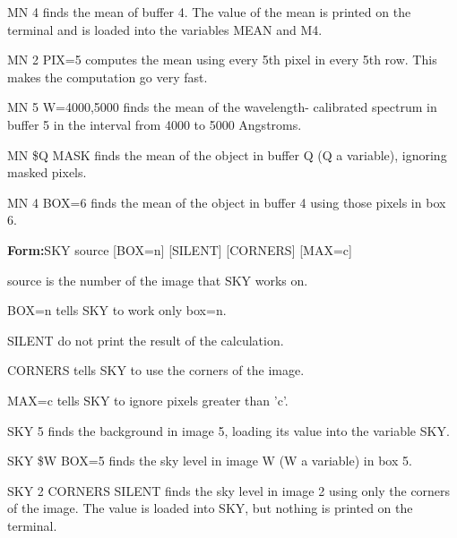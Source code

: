 {\newpage\clearpage
{}%
\begin{example}
  \item[MN 4\hfill]{finds the mean of buffer 4.  The
  value of the mean is printed on the terminal and is loaded into the 
  variables MEAN and M4.}
  \item[MN 2 PIX=5\hfill]{computes the mean using every 5th 
  pixel in every 5th row.  This makes the computation go very fast.}
  \item[MN 5 W=4000,5000\hfill]{finds the mean of the wavelength-
  calibrated spectrum in buffer 5 in the interval from 4000 to 5000 Angstroms.}
  \item[MN \$Q MASK\hfill]{finds the mean of the object in buffer
  Q (Q a variable), ignoring masked pixels.}
  \item[MN 4 BOX=6\hfill]{finds the mean of the object in
  buffer 4 using those pixels in box 6.}
\end{example}%
\lthtmlfigureZ
\lthtmlcheckvsize\clearpage}

{\newpage\clearpage
{}%
\begin{command}
  \item[\textbf{Form:}SKY source {[BOX=n]} {[SILENT]} {[CORNERS]}
       {[MAX=c]}\hfill]{}
  \item[source]{is the number of the image that SKY works on.}
  \item[BOX=n]{tells SKY to work only box=n.}
  \item[SILENT]{do not print the result of the calculation.}
  \item[CORNERS]{tells SKY to use the corners of the image.}
  \item[MAX=c]{tells SKY to ignore pixels greater than 'c'.}
\end{command}%
\lthtmlfigureZ
\lthtmlcheckvsize\clearpage}

{\newpage\clearpage
{}%
\begin{example}
  \item[SKY 5\hfill]{ finds the background in image 5, loading 
  its value into the variable SKY.}
  \item[SKY \$W BOX=5\hfill]{finds the sky level in image W
  (W a variable) in box 5.}
  \item[SKY 2 CORNERS SILENT\hfill]{finds the sky level in image 2 using
  only the corners of the image.  The value is loaded into SKY, but nothing
  is printed on the terminal.}
\end{example}%
\lthtmlfigureZ
\lthtmlcheckvsize\clearpage}

